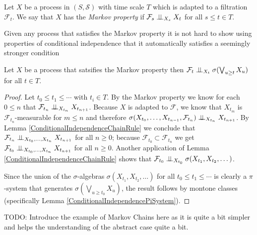 \begin{defn}Let $X$ be a process in $(S, \mathcal{S})$ with time scale
  $T$ which is adapted to a filtration $\mathcal{F}_t$.  We say that
  $X$ has the \emph{Markov property} if 
$\cindependent{\mathcal{F}_s}{X_t}{X_s}$ for all $s \leq t \in T$.
\end{defn}
Given any process that satisfies the Markov property it is not hard to
show using properties of conditional independence that it
automatically satisfies a seemingly stronger condition
\begin{lem}\label{ExtendedMarkovProperty}
Let $X$ be a process that satsifies the Markov property
  then $\cindependent{\mathcal{F}_t}{\sigma(\bigvee_{u \geq t}
    X_u)}{X_t}$ for all $t \in T$.
\end{lem}
\begin{proof}
Let $t_0 \leq t_1 \leq \cdots $ with $t_i \in T$.  By the
Markov property we know for each $0 \leq n$ that
$\cindependent{\mathcal{F}_{t_n}}{X_{t_{n+1}}}{X_{t_n}}$.  Because $X$ is
adapted to $\mathcal{F}$, we know that $X_{t_m}$ is
$\mathcal{F}_{t_n}$-measurable for $m \leq n$ and therefore
$\cindependent{\sigma(X_{t_0}, \dots
  ,X_{t_{n-1}},\mathcal{F}_{t_n})}{X_{t_{n+1}}}{X_{t_n}}$.
By Lemma \ref{ConditionalIndependenceChainRule} we conclude that $\cindependent{\mathcal{F}_{t_n}}{X_{t_{n+1}}}{X_{t_0}, \dots
  ,X_{t_n}}$ for all $n \geq 0$; because $\mathcal{F}_{t_0} \subset
\mathcal{F}_{t_n}$ we get $\cindependent{\mathcal{F}_{t_0}}{X_{t_{n+1}}}{X_{t_0}, \dots
  ,X_{t_n}}$ for all $n \geq 0$.  Another application of Lemma
\ref{ConditionalIndependenceChainRule} shows that
$\cindependent{\mathcal{F}_{t_0}}{\sigma(X_{t_1}, X_{t_2},
  \dots)}{X_{t_0}}$.

Since the union of the $\sigma$-algebras $\sigma(X_{t_1}, X_{t_2},
  \dots )$ for all $t_0 \leq t_1 \leq \cdots $ is
  clearly a $\pi$-system that generates $\sigma(\bigvee_{u \geq t_0}X_u)$, the result follows by montone classes (specifically Lemma \ref{ConditionalIndependencePiSystem}).
\end{proof}

TODO: Introduce the example of Markov Chains here as it is quite a bit
simpler and helps the
understanding of the abstract case quite a bit.

